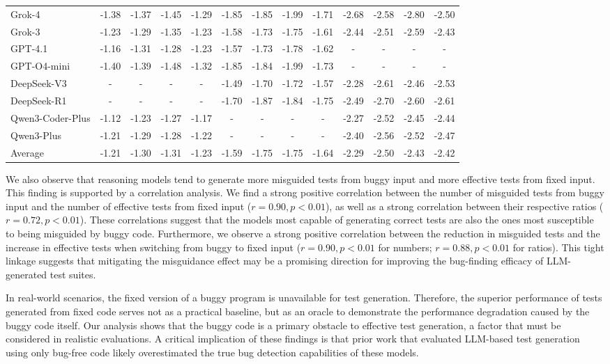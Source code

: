 \documentclass[acmsmall]{acmart}
\begin{document}
\begin{table}[b]
\begin{tabular}{l | c c | c c | c c | c c | c c | c c}
Grok-4 & -1.38 & -1.37 & -1.45 & -1.29 & -1.85 & -1.85 & -1.99 & -1.71 & -2.68 & -2.58 & -2.80 & -2.50 \\
Grok-3 & -1.23 & -1.29 & -1.35 & -1.23 & -1.58 & -1.73 & -1.75 & -1.61 & -2.44 & -2.51 & -2.59 & -2.43 \\
GPT-4.1 & -1.16 & -1.31 & -1.28 & -1.23 & -1.57 & -1.73 & -1.78 & -1.62 & - & - & - & - \\
GPT-O4-mini & -1.40 & -1.39 & -1.48 & -1.32 & -1.85 & -1.84 & -1.99 & -1.73 & - & - & - & - \\
DeepSeek-V3 & - & - & - & - & -1.49 & -1.70 & -1.72 & -1.57 & -2.28 & -2.61 & -2.46 & -2.53 \\
DeepSeek-R1 & - & - & - & - & -1.70 & -1.87 & -1.84 & -1.75 & -2.49 & -2.70 & -2.60 & -2.61 \\
Qwen3-Coder-Plus & -1.12 & -1.23 & -1.27 & -1.17 & - & - & - & - & -2.27 & -2.52 & -2.45 & -2.44 \\
Qwen3-Plus & -1.21 & -1.29 & -1.28 & -1.22 & - & - & - & - & -2.40 & -2.56 & -2.52 & -2.47 \\
\midrule
Average & -1.21 & -1.30 & -1.31 & -1.23 & -1.59 & -1.75 & -1.75 & -1.64 & -2.29 & -2.50 & -2.43 & -2.42 \\
\bottomrule
\end{tabular}
\vspace{-0.5em}
\end{table}
We also observe that reasoning models tend to generate more misguided tests from buggy input and more effective tests from fixed input. This finding is supported by a correlation analysis. We find a strong positive correlation between the number of misguided tests from buggy input and the number of effective tests from fixed input ($r=0.90, p < 0.01$), as well as a strong correlation between their respective ratios ($r=0.72, p < 0.01$). These correlations suggest that the models most capable of generating correct tests are also the ones most susceptible to being misguided by buggy code. Furthermore, we observe a strong positive correlation between the reduction in misguided tests and the increase in effective tests when switching from buggy to fixed input ($r=0.90, p < 0.01$ for numbers; $r=0.88, p < 0.01$ for ratios). This tight linkage suggests that mitigating the misguidance effect may be a promising direction for improving the bug-finding efficacy of LLM-generated test suites.

In real-world scenarios, the fixed version of a buggy program is unavailable for test generation. Therefore, the superior performance of tests generated from fixed code serves not as a practical baseline, but as an oracle to demonstrate the performance degradation caused by the buggy code itself. Our analysis shows that the buggy code is a primary obstacle to effective test generation, a factor that must be considered in realistic evaluations. A critical implication of these findings is that prior work \cite{OnLLMUTGenEvalASE2024, ChatVSSBSTTSE, TestGenLLMandMutIST} that evaluated LLM-based test generation using only bug-free code likely overestimated the true bug detection capabilities of these models.
\end{document}
